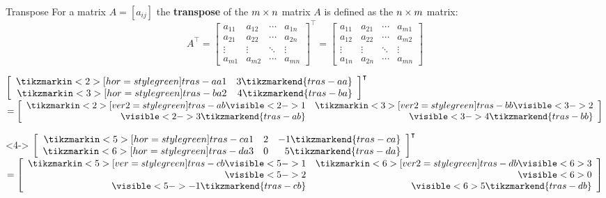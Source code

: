 \documentclass{beamer}
\begin{document}
\begin{frame}
\begin{block}{Transpose}
For a matrix $A=[a_{ij}]$ the \textbf{transpose} of  the $m \times n$ matrix $A$ is defined as the $n \times m$ matrix:
\begin{equation*}
A^\intercal = 
\begin{bmatrix}
a_{11}&a_{12}&\cdots&a_{1n}\\
a_{21}&a_{22}&\cdots&a_{2n}\\
\vdots&\vdots&\ddots&\vdots\\
a_{m1}&a_{m2}&\cdots&a_{mn}
\end{bmatrix}^\intercal=
\begin{bmatrix}
a_{11}&a_{21}&\cdots&a_{m1}\\
a_{12}&a_{22}&\cdots&a_{m2}\\
\vdots&\vdots&\ddots&\vdots\\
a_{1n}&a_{2n}&\cdots&a_{mn}
\end{bmatrix}
\end{equation*}
\end{block}\pause

\begin{example}
\centering
$\left[
	\begin{array}{rr}
		\tikzmarkin<2>[hor=style green]{tras-aa}1 & 3 \tikzmarkend{tras-aa}\\
		\tikzmarkin<3>[hor=style green]{tras-ba}2 & 4 \tikzmarkend{tras-ba}
	\end{array}
\right]^\intercal $
$= 
\left[
	\begin{array}{rr}
		\tikzmarkin<2>[ver2=style green]{tras-ab}\visible<2->{1} & \tikzmarkin<3>[ver2=style green]{tras-bb} \visible<3->{2} \\
		 \visible<2->{3} \tikzmarkend{tras-ab}& \visible<3->{4} \tikzmarkend{tras-bb}
	\end{array}
\right]$
\end{example}
\begin{example}<4->
\centering
$\left[
	\begin{array}{rrr}
		\tikzmarkin<5>[hor=style green]{tras-ca}1 & 2 & -1 \tikzmarkend{tras-ca}\\
		\tikzmarkin<6>[hor=style green]{tras-da}3 & 0 & 5 \tikzmarkend{tras-da}
	\end{array}
\right]^\intercal $
$= 
\left[
	\begin{array}{rr}
		\tikzmarkin<5>[ver=style green]{tras-cb}\visible<5->{1} & \tikzmarkin<6>[ver2=style green]{tras-db} \visible<6>{3} \\
		\visible<5->{2} & \visible<6>{0} \\
		\visible<5->{-1} \tikzmarkend{tras-cb}& \visible<6>{5} \tikzmarkend{tras-db}
	\end{array}
\right]$
\end{example}
\end{frame}
\end{document}
